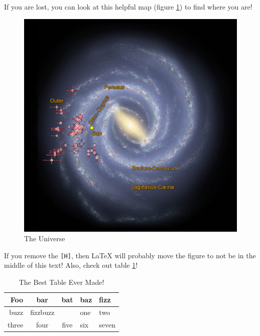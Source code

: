 \documentclass{article}
\begin{document}
If you are lost, you can look at this helpful map (figure \ref{fig:theuniverse}) to find where you are!

\begin{figure}[H] %
    \centering
    \includegraphics[width=\linewidth]{theuniverse.jpg}
    \caption{The Universe}
    \label{fig:theuniverse}
\end{figure}

If you remove the \verb|[H]|, then \LaTeX{} will probably move the figure to not be in the middle of this text! Also, check out table \ref{tab:mytable}!

\begin{table}[H]
    \centering
    \begin{tabular}{r|ccll}
        Foo & bar & bat & baz & fizz \\\hline
        buzz & fizzbuzz & & one & two \\
        three & four & five & six & seven \\
    \end{tabular}
    \caption{The Best Table Ever Made!}
    \label{tab:mytable}
\end{table}
\end{document}
